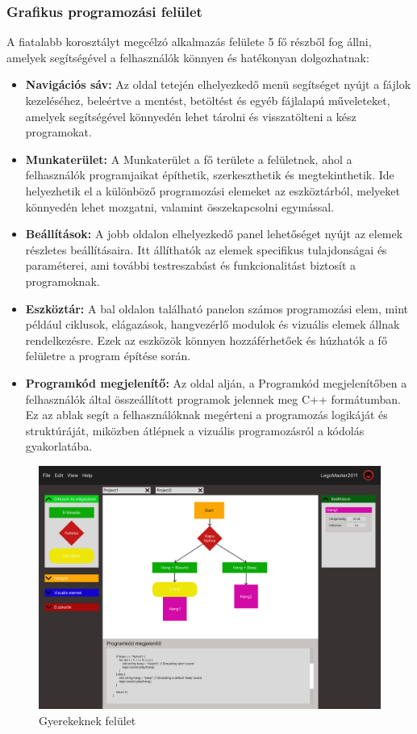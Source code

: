 \documentclass{article}
\begin{document}
\subsubsection{Grafikus programozási felület}

A fiatalabb korosztályt megcélzó alkalmazás felülete 5 fő részből fog állni, amelyek segítségével a felhasználók könnyen és hatékonyan dolgozhatnak:

\begin{itemize}
\item \textbf{Navigációs sáv:} 
Az oldal tetején elhelyezkedő menü segítséget nyújt a fájlok kezeléséhez, beleértve a mentést, betöltést és egyéb fájlalapú műveleteket, amelyek segítségével könnyedén lehet tárolni és visszatölteni a kész programokat.
\item \textbf{Munkaterület:}
A Munkaterület a fő területe a felületnek, ahol a felhasználók programjaikat építhetik, szerkeszthetik és megtekinthetik. Ide helyezhetik el a különböző programozási elemeket az eszköztárból, melyeket könnyedén lehet mozgatni, valamint összekapcsolni egymással.
\item \textbf{Beállítások:} 
A jobb oldalon elhelyezkedő panel lehetőséget nyújt az elemek részletes beállításaira. Itt állíthatók az elemek specifikus tulajdonságai és paraméterei, ami további testreszabást és funkcionalitást biztosít a programoknak.
\item \textbf{Eszköztár:}
A bal oldalon található panelon számos programozási elem, mint például ciklusok, elágazások, hangvezérlő modulok és vizuális elemek állnak rendelkezésre. Ezek az eszközök könnyen hozzáférhetőek és húzhatók a fő felületre a program építése során.
\item \textbf{Programkód megjelenítő:}
Az oldal alján, a Programkód megjelenítőben a felhasználók által összeállított programok jelennek meg C++ formátumban. Ez az ablak segít a felhasználóknak megérteni a programozás logikáját és struktúráját, miközben átlépnek a vizuális programozásról a kódolás gyakorlatába.
\end{itemize}

\begin{figure}[H]
\centering
\includegraphics[width=1\linewidth]{gyerekeknek-felulet.png}
\caption{\label{fig:image}Gyerekeknek felület}
\end{figure}
\end{document}
